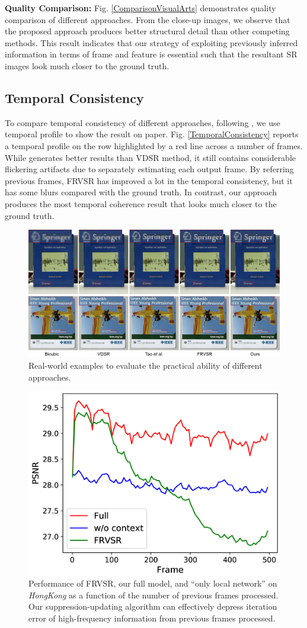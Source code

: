 \documentclass[letterpaper]{article} %
\begin{document}
\textbf{Quality Comparison:} Fig. \ref{ComparisonVisualArts} demonstrates quality comparison of different approaches. From the close-up images, we observe that the proposed approach produces better structural detail than other competing methods. This result indicates that our strategy of exploiting previously inferred information in terms of frame and feature is essential such that the resultant SR images look much closer to the ground truth.



\subsection{Temporal Consistency}

To compare temporal consistency of different approaches, following \cite{VESPCN2017cvpr}, we use temporal profile to show the result on paper. Fig. \ref{TemporalConsistency} reports a temporal profile on the row highlighted by a red line across a number of frames. While \cite{Tao2017iccv} generates better results than VDSR method, it still contains considerable flickering artifacts due to separately estimating each output frame. By referring previous frames, FRVSR has improved a lot in the temporal consistency, but it has some blurs compared with the ground truth. In contrast, our approach produces the most temporal coherence result that looks much closer to the ground truth.



\begin{figure}[t]
\centering
\includegraphics[width=8 cm]{Fig9.png}
\caption{Real-world examples to evaluate the practical ability of different approaches.}
\label{RealWorldExamples}
\end{figure}





\begin{figure}[t]
\centering
\includegraphics[width=6.1 cm]{Fig11.png}
\caption{Performance of FRVSR, our full model, and ``only local network'' on \textit{HongKong} as a function of the number of previous frames processed. Our suppression-updating algorithm can effectively depress iteration error of high-frequency information from previous frames processed.}
\label{SuppressingCurve}
\end{figure}
\end{document}

